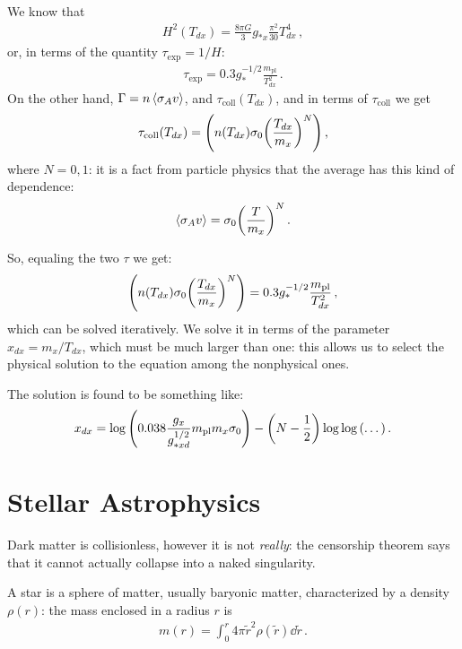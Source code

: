 \documentclass[main.tex]{subfiles}
\begin{document}
We know that 
%
\begin{align}
  H^2 (T_{dx}) = \frac{8 \pi G}{3} g_{*x} \frac{\pi^2}{30} T_{dx}^{4}
\,,
\end{align}
%
or, in terms of the quantity \(\tau_{\text{exp}}= 1/H\):
%
\begin{align}
  \tau_{\text{exp}} = 0.3 g_{*}^{-1/2} \frac{m _{\text{pl}}}{T_{dx}^2}
\,.
\end{align}
%
On the other hand, \(\Gamma = n \expval{\sigma _A v}\), and \(\tau _{\text{coll}} ( T_{dx})\), and in terms of \(\tau _{\text{coll}}\) we get 
%
\begin{align}
  \tau _{\text{coll}} (T_{dx}) = \qty(n(T_{dx}) \sigma _0 \qty(\frac{T_{dx}}{m_x})^{N})
\,,
\end{align}
%
where \(N = 0,1\): it is a fact from particle physics that the average has this kind of dependence: 
%
\begin{align}
  \expval{\sigma _A v} = \sigma_0 \qty(\frac{T}{m_x})^{N}
\,.
\end{align}

So, equaling the two \(\tau \) we get: 
%
\begin{align}
\qty(n(T_{dx}) \sigma _0 \qty(\frac{T_{dx}}{m_x})^{N})= 0.3 g_{*}^{-1/2} \frac{m _{\text{pl}}}{T_{dx}^2}
\,,
\end{align}
%
which can be solved iteratively. We solve it in terms of the parameter \(x_{dx} = m_x / T_{dx}\), which must be much larger than one: this allows us to select the physical solution to the equation among the nonphysical ones. 

The solution is found to be something like: 
%
\begin{align}
  x_{dx} = \log \qty(\num{.038} \frac{g_{x}}{g_{*xd}^{1/2}} m _{\text{pl}}  m_x \sigma_0 ) - \qty(N - \frac{1}{2}) \log \log \qty(\dots)
\,. 
\end{align}
%

\chapter{Stellar Astrophysics}

Dark matter is collisionless, however it is not \emph{really}: the censorship theorem says that it cannot actually collapse into a naked singularity. 

A star is a sphere of matter, usually baryonic matter, characterized by a density \(\rho (r)\): the mass enclosed in a radius \(r\) is 
%
\begin{align}
  m(r) = \int_{0}^{r} 4 \pi \widetilde{r}^2 \rho (\widetilde{r}) \dd{\widetilde{r}}
\,.
\end{align}
\end{document}
